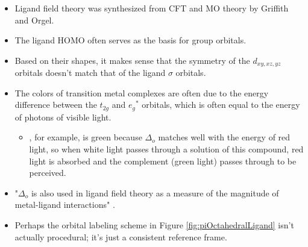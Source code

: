 \documentclass[../notes.tex]{subfiles}
\begin{document}
\begin{itemize}
\begin{itemize}
\begin{figure}[h!]
            \caption{Crystal field splitting from the free ion.}
            \label{fig:CFT-freeIon}
        \end{figure}
        \item "The average energy of the five $d$ orbitals [in a coordination complex] is above that of the free ion orbitals [i.e., those in the metal ion before it is surrounded by ligands], because the electrostatic field of the ligands raises their energy" \parencite[364]{bib:MiesslerFischerTarr}.
        \item CFT is flawed because as we can see from Figure \ref{fig:CFT-freeIon}, there is no energetically favorable bonding; at best, we could have zero energy difference between the free ion and bonded octahedral field state (this occurs if only the $t_{2g}$ orbitals are occupied).
    \end{itemize}
    \item {}Ligand field theory was synthesized from CFT and MO theory by Griffith and Orgel.
    \item The ligand HOMO often serves as the basis for group orbitals.
    \item Based on their shapes, it makes sense that the symmetry of the $d_{xy,xz,yz}$ orbitals doesn't match that of the ligand $\sigma$ orbitals.
    \item The colors of transition metal complexes are often due to the energy difference between the $t_{2g}$ and ${e_g}^*$ orbitals, which is often equal to the energy of photons of visible light.
    \begin{itemize}
        \item {}, for example, is green because $\Delta_o$ matches well with the energy of red light, so when white light passes through a solution of this compound, red light is absorbed and the complement (green light) passes through to be perceived.
    \end{itemize}
    \item "$\Delta_o$ is also used in ligand field theory as a measure of the magnitude of metal-ligand interactions" \parencite[367]{bib:MiesslerFischerTarr}.
    \item Perhaps the orbital labeling scheme in Figure \ref{fig:piOctahedralLigand} isn't actually procedural; it's just a consistent reference frame.

\end{itemize}
\end{document}

